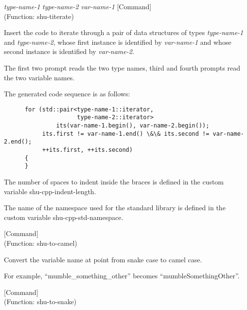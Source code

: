 \vspace{1em}
\noindent
{}
\usebox{\funcname}\emph{type-name-1} \emph{type-name-2} \emph{var-name-1}
 \hfill [Command]
\hspace*{\wd\funcname}\\%
 (Function: shu-titerate)

\begin{doc-string}
Insert the code to iterate through a pair of data structures of types
\emph{type-name-1} and \emph{type-name-2}, whose first instance is identified by \emph{var-name-1}
and whose second instance is identified by \emph{var-name-2}.

The first two prompt reads the two type names, third and fourth prompts read the
two variable names.

The generated code sequence is as follows:

\small{\begin{verbatim}
      for (std::pair<type-name-1::iterator,
                     type-name-2::iterator>
               its(var-name-1.begin(), var-name-2.begin());
           its.first != var-name-1.end() \&\& its.second != var-name-2.end();
           ++its.first, ++its.second)
      {
      }
\end{verbatim}}

The number of spaces to indent inside the braces is defined in the custom
variable shu-cpp-indent-length.

The name of the namespace used for the standard library is defined in the custom
variable shu-cpp-std-namespace.
\end{doc-string}

\vspace{1em}
\noindent
{}
\usebox{\funcname}
 \hfill [Command]\\%
 (Function: shu-to-camel)

\begin{doc-string}
Convert the variable name at point from snake case to camel case.

For example, ``mumble\_something\_other'' becomes ``mumbleSomethingOther''.
\end{doc-string}

\vspace{1em}
\noindent
{}
\usebox{\funcname}
 \hfill [Command]\\%
 (Function: shu-to-snake)

